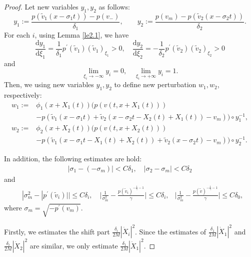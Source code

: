 \documentclass[10pt,reqno]{amsart}
\numberwithin{equation}{section}
\newcommand{\dif}{\mathrm{d}}
\begin{document}
\begin{proof}
Let new variables $y_1,y_2$ as follows:
\begin{equation}\label{4.5}
y_1:=\frac{p(\widetilde{v}_1(x-\sigma_1t))-p(v_-)}{\delta_1},\qquad
y_2:=\frac{p(v_m)-p(\widetilde{v}_2(x-\sigma_2t))}{\delta_2}.
\end{equation}
For each $i$, using Lemma \ref{le2.1}, we have
\[
\frac{\dif y_1}{\dif \xi_1}=\frac{1}{\delta_1}p^{\prime}(\widetilde{v}_1)(\widetilde{v}_1)_{\xi_1}>0,\quad
\frac{\dif y_2}{\dif \xi_2}=-\frac{1}{\delta_2}p^{\prime}(\widetilde{v}_2)(\widetilde{v}_2)_{\xi_2}>0
\]
and
\[
\lim_{\xi_i\rightarrow-\infty}y_i=0,\quad\lim_{\xi_i\rightarrow+\infty}y_i=1.
\]
Then, we using new variables $y_1,y_2$ to define new perturbation $w_1,w_2$, respectively:
\begin{equation}\label{4.6}
\begin{aligned}
w_1:=&\phi_1(x+X_1(t))\Big(p(v(t,x+X_1(t)))\\
&-p\left(\widetilde{v}_1(x-\sigma_1t)+\widetilde{v}_2(x-\sigma_2t-X_2(t)+X_1(t))-v_m\right)\Big)\circ y_1^{-1},\\
w_2:=&\phi_2(x+X_2(t))\Big(p(v(t,x+X_2(t)))\\
&-p\left(\widetilde{v}_1(x-\sigma_1t-X_1(t)+X_2(t))+\widetilde{v}_2(x-\sigma_2t)-v_m\right)\Big)\circ y_2^{-1}.
\end{aligned}
\end{equation}

In addition, the following estimates are hold:
\begin{align}\label{4.7}
|\sigma_1-(-\sigma_m)|<C\delta_1,\quad |\sigma_2-\sigma_m|<C\delta_2
\end{align}
and
\begin{equation}\label{4.8}
\begin{aligned}
&|\sigma_m^2-|p^{\prime}(\widetilde{v}_i)||\le C\delta_i,\quad
\Big|\frac{1}{\sigma_m^2}-\frac{p(\widetilde{v}_i)^{-\frac{1}{\gamma}-1}}{\gamma}\Big|\le C\delta_i,
&\Big|\frac{1}{\sigma_m^2}-\frac{p(\widetilde{v})^{-\frac{1}{\gamma}-1}}{\gamma}\Big|\le C\delta_0,
\end{aligned}
\end{equation}
where $\sigma_m=\sqrt{-p^{\prime}(v_m)}$.

Firstly, we estimates the shift part $\frac{\delta_i}{2M}|\dot{X}_i|^2$. Since the estimates of $\frac{\delta_1}{2M}|\dot{X}_1|^2$ and$\frac{\delta_i}{2M}|\dot{X}_2|^2$ are similar, we only estimate $\frac{\delta_1}{2M}|\dot{X}_1|^2$.


\end{proof}
\end{document}
